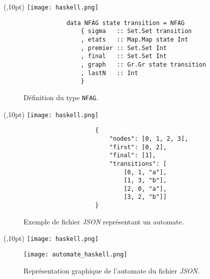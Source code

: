 \documentclass[aspectratio=169,xcolor=dvipsnames]{beamer}
\begin{document}

\begin{frame}[fragile]
    \begin{textblock*}{20pt}(\textwidth-50pt,10pt)
        \texttt{[image: haskell.png]}
    \end{textblock*}
    \begin{figure}
        \begin{verbatim}
            data NFAG state transition = NFAG
                { sigma   :: Set.Set transition
                , etats   :: Map.Map state Int
                , premier :: Set.Set Int
                , final   :: Set.Set Int
                , graph   :: Gr.Gr state transition
                , lastN   :: Int
                }
        \end{verbatim}
        \caption{Définition du type \texttt{NFAG}.}
    \end{figure}
\end{frame}


\begin{frame}[fragile]
    \begin{textblock*}{20pt}(\textwidth-50pt,10pt)
        \texttt{[image: haskell.png]}
    \end{textblock*}
    \begin{figure}
        \begin{verbatim}
                    {
                        "nodes": [0, 1, 2, 3],
                        "first": [0, 2],
                        "final": [1],
                        "transitions": [
                            [0, 1, "a"], 
                            [1, 3, "b"], 
                            [2, 0, "a"], 
                            [3, 2, "b"]] 
                    }
        \end{verbatim}
        \caption{Exemple de fichier \textit{JSON} représentant un automate.}
    \end{figure}
\end{frame}


\begin{frame}
    \begin{textblock*}{20pt}(\textwidth-50pt,10pt)
        \texttt{[image: haskell.png]}
    \end{textblock*}
    \begin{figure}
        \texttt{[image: automate\_haskell.png]}
        \caption{
            Représentation graphique de l'automate du fichier \textit{JSON}.
        }
    \end{figure}
\end{frame}
\end{document}
